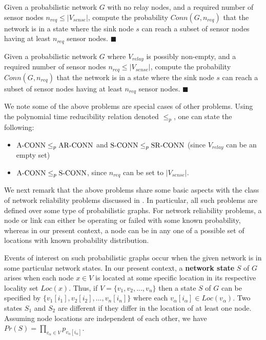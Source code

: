 \begin{definition}
Given a probabilistic network $G$ with no relay nodes, and a required number of sensor nodes $n_{req}\leq |V_{sense}|$, compute the probability $Conn(G,n_{req})$ that the network is in a state where the sink node $s$ can reach a subset of sensor nodes having at least $n_{req}$ sensor nodes. $\blacksquare$
\end{definition}


\begin{definition}

Given a probabilistic network $G$ where $V_{relay}$ is possibly non-empty, and a required number of sensor nodes $n_{req}\leq |V_{sense}|$, compute the probability $Conn(G,n_{req})$ that the network is in a state where the sink node $s$ can reach a subset of sensor nodes having at least $n_{req}$ sensor nodes. $\blacksquare$
\end{definition}

We note some of the above problems are special cases of other problems. Using the polynomial time reducibility relation \cite{cormen2001introduction} denoted $\leq_p$, one can state the following:
\begin{itemize}
\item ${\mathrm {A\mbox{-}CONN}} \leq_p {\mathrm {AR\mbox{-}CONN}}$ and ${\mathrm {S\mbox{-}CONN}} \leq_p {\mathrm {SR\mbox{-}CONN}}$ (since $V_{relay}$ can be an empty set)
\item ${\mathrm {A\mbox{-}CONN}} \leq_p {\mathrm {S\mbox{-}CONN}}$, since $n_{req}$ can be set to $|V_{sense}|$.
\end{itemize}

We next remark that the above problems share some basic aspects with the class of network reliability problems discussed in \cite{Co87}. In particular, all such problems are defined over some type of probabilistic graphs. For network reliability problems, a node or link can either be operating or failed with some known probability, whereas in our present context, a node can be in any one of a possible set of locations with known probability distribution.

Events of interest on such probabilistic graphs occur when the given network is in some particular network states. In our present context, a \textbf{network state} $S$ of $G$ arises when each node $x \in V$ is located at some specific location in its respective locality set $Loc(x)$.
Thus, if $V = \{v_1 , v_2 , . . . , v_n \}$ then a state $S$ of $G$ can be specified by $\{v_1[i_1], v_2[i_2], . . . , v_n[i_n]\}$ where each $v_\alpha[i_\alpha] \in Loc(v_{\alpha})$. Two states $S_1$ and $S_2$ are different if they differ in the location of at least one node. Assuming node locations are independent of each other, we have $Pr(S) =\prod_{v_{\alpha}\in V} p_{v_\alpha[i_\alpha]}$.

